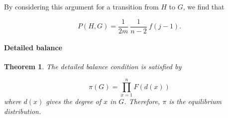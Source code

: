 \documentclass[a4paper,10pt]{article}
\newtheorem{theorem}{Theorem}
\begin{document}
\noindent By considering this argument for a transition from $H$ to $G$, we find that

\begin{equation}
 P(H, G) = \frac{1}{2m} \: \frac{1}{n - 2} \: f(j - 1).
\end{equation}

\paragraph{Detailed balance}
\begin{theorem}
 The detailed balance condition is satisfied by

\begin{equation}
 \pi(G) = \prod_{x = 1}^{n} F(d(x))
\end{equation}
where $d(x)$ gives the degree of $x$ in $G$. Therefore, $\pi$ is the equilibrium distribution.

\end{theorem}
\end{document}
